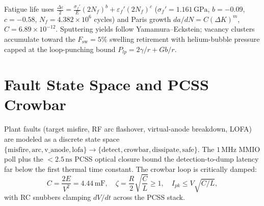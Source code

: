 \documentclass[10pt,journal,compsoc]{IEEEtran}
\begin{document}
Fatigue life uses
$\frac{\Delta\varepsilon}{2} = \frac{\sigma_f'}{E}(2N_f)^b +
\varepsilon_f'(2N_f)^c$ ($\sigma_f' = 1.161\,\mathrm{GPa}$, $b=-0.09$,
$c=-0.58$, $N_f = 4.382\times10^6$ cycles) and Paris growth
$da/dN = C(\Delta K)^m$, $C = 6.89\times10^{-12}$. Sputtering yields
follow Yamamura--Eckstein; vacancy clusters accumulate toward the
$F_{\mathrm{sw}} = 5\%$ swelling retirement with helium-bubble pressure
capped at the loop-punching bound $P_{lp} = 2\gamma/r + Gb/r$.

\section{Fault State Space and PCSS Crowbar}
\label{app:fault}
Plant faults (target misfire, RF arc flashover, virtual-anode
breakdown, LOFA) are modeled as a discrete state space
$\{\mathrm{misfire}, \mathrm{arc}, \mathrm{v\_anode},
\mathrm{lofa}\} \to \{\mathrm{detect}, \mathrm{crowbar},
\mathrm{dissipate}, \mathrm{safe}\}$. The $1\,\mathrm{MHz}$ MMIO
poll plus the $<2.5\,\mathrm{ns}$ PCSS optical closure bound the
detection-to-dump latency far below the first thermal time constant.
The crowbar loop is critically damped:
\begin{equation}
C = \frac{2E}{V^2} = 4.44\,\mathrm{mF},\quad
\zeta = \frac{R}{2}\sqrt{\frac{C}{L}} \ge 1,\quad
I_{pk} \le V\sqrt{C/L},
\end{equation}
with RC snubbers clamping $dV/dt$ across the PCSS stack.
\end{document}
